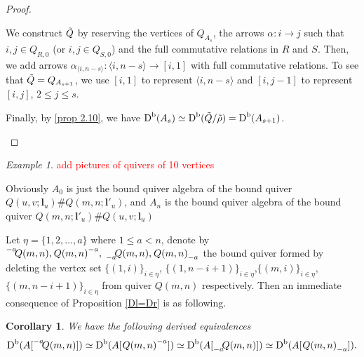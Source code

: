 \documentclass[a4paper, reqno]{amsart}
\newtheorem{cor}[thm]{Corollary}
\theoremstyle{definition}
\theoremstyle{remark}
\newtheorem{exm}[thm]{Example}
\numberwithin{equation}{section}
\begin{document}
\begin{proof}
\begin{itemize}
We construct $ \Tilde{Q}$ by reserving the vertices of $Q_{A_{s}}$, the arrows $ \alpha: i\to j$  such that $ i,j \in Q_{R,0}$ (or $i,j \in Q_{S,0}$) and the full commutative relations in $R$ and $S$. Then, we add arrows $ \alpha_{\langle i,n-s \rangle}: \langle i,n-s \rangle \to [i,1]$ with full commutative relations. To see that $\Tilde{Q} = Q_{A_{s+1}}$, we use $ [i,1]$ to represent $\langle i, n-s\rangle $ and $ [i,j-1]$ to represent $[i,j] $, $ 2\leq j\leq s $. 

Finally, by \ref{prop 2.10}, we have $\textup{D}^{\textup{b}}(A_s) \simeq \textup{D}^{\textup{b}}(\Tilde{Q}/\Tilde{\rho}) =\textup{D}^{\textup{b}}(A_{s+1}) $.

\end{itemize}
    
\end{proof}

\begin{exm}
    \textcolor{red}{add pictures of quivers of 10 vertices}
\end{exm}


Obviously $A_0$ is just the bound quiver algebra of the bound quiver $Q(u,v;{\mathbf{l}}_u)\#Q(m,n;{\mathbf{l}'}_u)$, and $A_n$ is the bound quiver algebra of the bound quiver $Q(m,n;{\mathbf{l}'}_u)\#Q(u,v;{\mathbf{l}}_u)$

Let $\eta = \{1,2,\dots,a\} $ where $1\leq a < n$, denote by ${\vphantom{Q(m,n)}}^{-a}\negmedspace{Q(m,n)},\;{\vphantom{Q(m,n)}}\negmedspace{Q(m,n)}^{-a},\;{\vphantom{Q(m,n)}}_{-a}\negmedspace{Q(m,n)},\;{\vphantom{Q(m,n)}}\negmedspace{Q(m,n)}_{-a}$ the bound quiver formed by deleting the vertex set $\{(1,i)\}_{i\in \eta}$, $\{(1,n-i+1)\}_{i\in \eta}$,$\{(m,i)\}_{i\in \eta}$, $\{(m,n-i+1)\}_{i\in \eta}$ from quiver $ Q(m,n)$ respectively. Then an immediate consequence of Proposition \ref{Dl=Dr} is as following.

\begin{cor}
We have the following derived equivalences
$$
    \textup{D}^{\textup{b}}(A[{\vphantom{Q(m,n)}}^{-a}\negmedspace{Q(m,n)}]) \simeq \textup{D}^{\textup{b}}(A[\;{\vphantom{Q(m,n)}}\negmedspace{Q(m,n)}^{-a}]) \simeq \textup{D}^{\textup{b}}(A[{\vphantom{Q(m,n)}}_{-a}\negmedspace{Q(m,n)}])\simeq \textup{D}^{\textup{b}}(A[\;{\vphantom{Q(m,n)}}\negmedspace{Q(m,n)}_{-a}]).
    $$
\end{cor}
\end{document}
